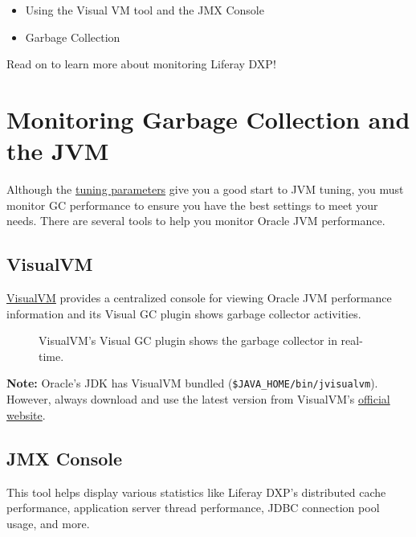 \begin{itemize}
\tightlist
\item
  Using the Visual VM tool and the JMX Console
\item
  Garbage Collection
\end{itemize}

Read on to learn more about monitoring Liferay DXP!

\chapter{Monitoring Garbage Collection and the
JVM}\label{monitoring-garbage-collection-and-the-jvm}

Although the
\href{/docs/7-2/deploy/-/knowledge_base/d/tuning-guidelines}{tuning
parameters} give you a good start to JVM tuning, you must monitor GC
performance to ensure you have the best settings to meet your needs.
There are several tools to help you monitor Oracle JVM performance.

\section{VisualVM}\label{visualvm}

\href{https://visualvm.github.io/}{VisualVM} provides a centralized
console for viewing Oracle JVM performance information and its Visual GC
plugin shows garbage collector activities.

\begin{figure}
\centering
{}
\caption{VisualVM's Visual GC plugin shows the garbage collector in
real-time.}
\end{figure}

\noindent\hrulefill

\textbf{Note:} Oracle's JDK has VisualVM bundled
(\texttt{\$JAVA\_HOME/bin/jvisualvm}). However, always download and use
the latest version from VisualVM's
\href{https://visualvm.github.io/}{official website}.

\noindent\hrulefill

\section{JMX Console}\label{jmx-console}

This tool helps display various statistics like Liferay DXP's
distributed cache performance, application server thread performance,
JDBC connection pool usage, and more.

